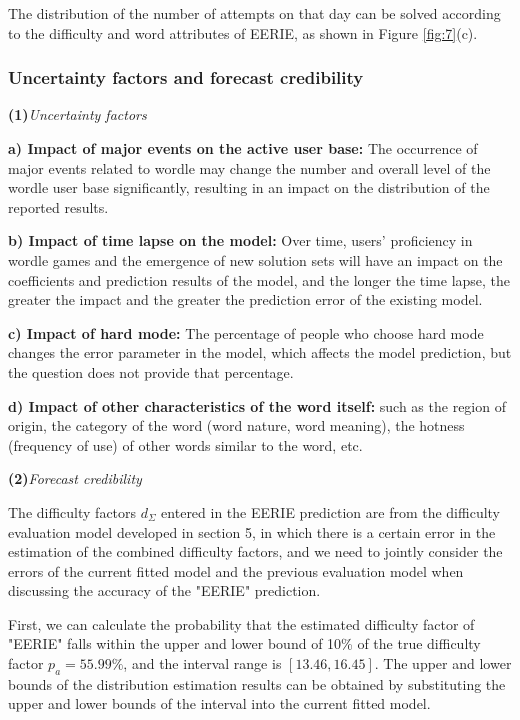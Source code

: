 \documentclass[12pt]{mcmthesis}
\begin{document}
The distribution of the number of attempts on that day can be solved according to the difficulty and word attributes of EERIE, as shown in Figure \ref{fig:7}(c).
\\[0.01pt]
\subsubsection{Uncertainty factors and forecast credibility}
\hspace{1.4em}\textbf{(1)}\textit{Uncertainty factors}

\textbf{a) Impact of major events on the active user base: } The occurrence of major events related to wordle may change the number and overall level of the wordle user base significantly, resulting in an impact on the distribution of the reported results.

\textbf{b) Impact of time lapse on the model: } Over time, users' proficiency in wordle games and the emergence of new solution sets will have an impact on the coefficients and prediction results of the model, and the longer the time lapse, the greater the impact and the greater the prediction error of the existing model.

\textbf{c) Impact of hard mode: } The percentage of people who choose hard mode changes the error parameter in the model, which affects the model prediction, but the question does not provide that percentage.

\textbf{d) Impact of other characteristics of the word itself: } such as the region of origin, the category of the word (word nature, word meaning), the hotness (frequency of use) of other words similar to the word, etc.

\textbf{(2)}\textit{Forecast credibility}

The difficulty factors $ d_{\varSigma } $ entered in the EERIE prediction are from the difficulty evaluation model developed in section 5, in which there is a certain error in the estimation of the combined difficulty factors, and we need to jointly consider the errors of the current fitted model and the previous evaluation model when discussing the accuracy of the "EERIE" prediction.

First, we can calculate the probability that the estimated difficulty factor of "EERIE" falls within the upper and lower bound of 10\% of the true difficulty factor $ p_{a}=55.99\% $, and the interval range is $ [13.46, 16.45] $. The upper and lower bounds of the distribution estimation results can be obtained by substituting the upper and lower bounds of the interval into the current fitted model.
\end{document}
